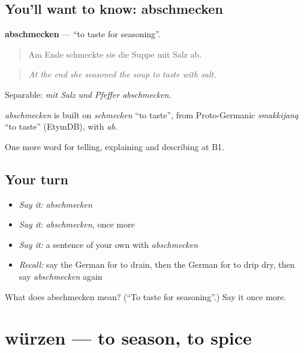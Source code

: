 \subsection*{You'll want to know: abschmecken}
\textbf{abschmecken} — \textquotedblleft{}to taste for seasoning\textquotedblright{}.

\begin{quote}
Am Ende schmeckte sie die Suppe mit Salz ab.
\end{quote}

\begin{quote}
\emph{At the end she seasoned the soup to taste with salt.}
\end{quote}

Separable: \emph{mit Salz und Pfeffer abschmecken}.

\begin{cousinweb}
\emph{abschmecken} is built on \emph{schmecken} \textquotedblleft{}to taste\textquotedblright{}, from Proto-Germanic \emph{smakkijaną} \textquotedblleft{}to taste\textquotedblright{} (EtymDB), with \emph{ab}.
\end{cousinweb}

\begin{grammarlens}[title={What you've built}]
One more word for telling, explaining and describing at B1.
\end{grammarlens}

\subsection*{Your turn}
\begin{itemize}
\raggedright
  \item \emph{Say it:} \emph{abschmecken}
  \item \emph{Say it:} \emph{abschmecken}, once more
  \item \emph{Say it:} a sentence of your own with \emph{abschmecken}
  \item \emph{Recall:} say the German for to drain, then the German for to drip dry, then say \emph{abschmecken} again
\end{itemize}

\begin{tcolorbox}[breakable,colback=teal!4,colframe=teal!35!black,title={Before you move on}]
What does abschmecken mean? (\textquotedblleft{}To taste for seasoning\textquotedblright{}.) Say it once more.
\end{tcolorbox}
\section[würzen]{würzen — to season, to spice}

